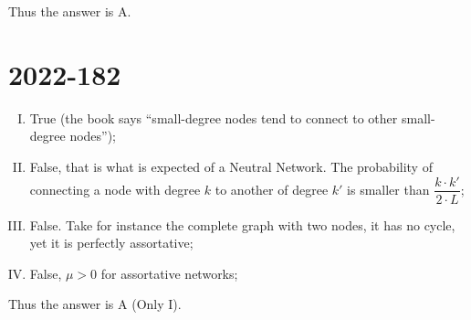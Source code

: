 \documentclass{article}
\begin{document}
Thus the answer is A.

\section{2022-182}\label{2022-182}

\begin{enumerate}[I.]
    \item True (the book says ``small-degree nodes tend to connect to other small-degree nodes'');
    \item False, that is what is expected of a Neutral Network. The probability of connecting a node with degree $k$ to another of degree $k'$ is smaller than $\dfrac{k \cdot k'}{2 \cdot L}$;
    \item False. Take for instance the complete graph with two nodes, it has no cycle, yet it is perfectly assortative;
    \item False, $\mu > 0$ for assortative networks;
\end{enumerate}

Thus the answer is A (Only I).
\end{document}
